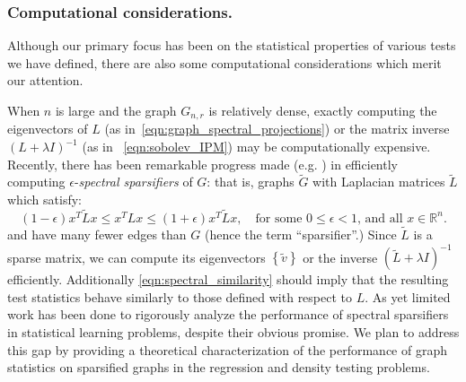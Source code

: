 \documentclass{article}
\newcommand{\Reals}{\mathbb{R}}
\newcommand{\set}[1]{\left\{#1\right\}}
\newcommand{\1}{\mathbf{1}}
\newcommand{\Pbb}{\mathbb{P}}
\theoremstyle{alden}
\theoremstyle{aldenthm}
\theoremstyle{definition}
\theoremstyle{remark}
\begin{document}
\subsubsection{Computational considerations.}

Although our primary focus has been on the statistical properties of various tests we have defined, there are also some computational considerations which merit our attention.

When $n$ is large and the graph $G_{n,r}$ is relatively dense, exactly computing the eigenvectors of $L$ (as in~\eqref{eqn:graph_spectral_projections}) or the matrix inverse $(L + \lambda I)^{-1}$ (as in ~\eqref{eqn:sobolev_IPM}) may be computationally expensive. Recently, there has been remarkable progress made (e.g. \citet{spielman2011,batson13,spielman2014,cohen14}) in efficiently computing $\epsilon$-\emph{spectral sparsifiers} of $G$: that is, graphs $\widetilde{G}$ with Laplacian matrices $\widetilde{L}$ which satisfy:
\begin{equation}
\label{eqn:spectral_similarity}
(1 - \epsilon)x^T \widetilde{L} x \leq x^T L x \leq (1 + \epsilon) x^T \widetilde{L} x, \quad \textrm{for some $0 \leq \epsilon < 1$, and all $x \in \Reals^n$.}
\end{equation}
and have many fewer edges than $G$ (hence the term ``sparsifier''.) Since $\widetilde{L}$ is a sparse matrix, we can compute its eigenvectors $\set{\widetilde{v}}$ or the inverse $(\widetilde{L} + \lambda I)^{-1}$  efficiently. Additionally \eqref{eqn:spectral_similarity} should imply that the resulting test statistics behave similarly to those defined with respect to $L$. As yet limited work \citet{vonluxburg2014,sadhanala16b} has been done to rigorously analyze the performance of spectral sparsifiers in statistical learning problems, despite their obvious promise. We plan to address this gap by providing a theoretical characterization of the performance of graph statistics on sparsified graphs in the regression and density testing problems.


\clearpage



\end{document}
